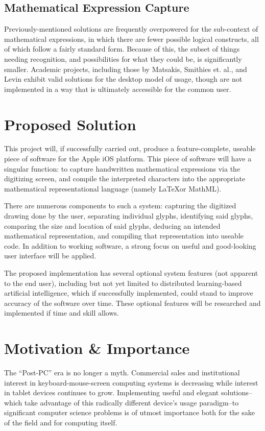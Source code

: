 \documentclass{acm_proc_article-sp}
\begin{document}
\subsection{Mathematical Expression Capture}
Previously-mentioned solutions are frequently overpowered for the sub-context of mathematical expressions, in which there are fewer possible logical constructs, all of which follow a fairly standard form. Because of this, the subset of things needing recognition, and possibilities for what they could be, is significantly smaller. Academic projects, including those by Matsakis\cite{matsakis_recognition_1999}, Smithies et. al.\cite{smithies_handwriting-based_1999}, and Levin\cite{levin_cellwriter:_2007} exhibit valid solutions for the desktop model of usage, though are not implemented in a way that is ultimately accessible for the common user.

\section{Proposed Solution}
This project will, if successfully carried out, produce a feature-complete, useable piece of software for the Apple iOS platform. This piece of software will have a singular function: to capture handwritten mathematical expressions via the digitizing screen, and compile the interpreted characters into the appropriate mathematical representational language (namely \LaTeX or MathML). 

There are numerous components to such a system: capturing the digitized drawing done by the user, separating individual glyphs, identifying said glyphs, comparing the size and location of said glyphs, deducing an intended mathematical representation, and compiling that representation into useable code. In addition to working software, a strong focus on useful and good-looking user interface will be applied. 

The proposed implementation has several optional system features (not apparent to the end user), including but not yet limited to distributed learning-based artificial intelligence, which if successfully implemented, could stand to improve accuracy of the software over time. These optional features will be researched and implemented if time and skill allows.

\section{Motivation \& Importance}
The ``Post-PC'' era is no longer a myth. Commercial sales and institutional interest in keyboard-mouse-screen computing systems is decreasing while interest in tablet devices continues to grow. Implementing useful and elegant solutions--which take advantage of this radically different device's usage paradigm--to significant computer science problems is of utmost importance both for the sake of the field and for computing itself. 
\end{document}
